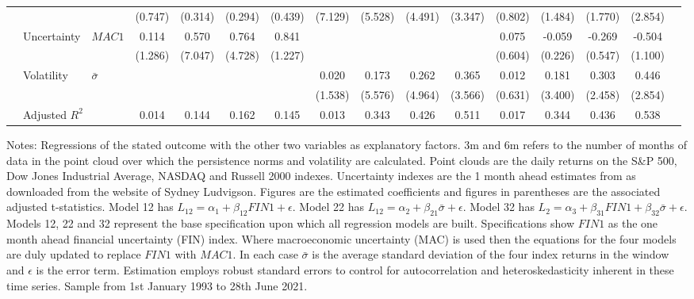 \documentclass{article}
\begin{document}
\begin{sidewaystable}
\begin{center}
\begin{tabular}{ll l c c c c c c c c c c c c c}
			&&&(0.747)&(0.314)&(0.294)&(0.439)&(7.129)&(5.528)&(4.491)&(3.347)&(0.802)&(1.484)&(1.770)&(2.854)\\
			&Uncertainty & $MAC1$&0.114&0.570&0.764&0.841&&&&&0.075&-0.059&-0.269&-0.504\\
			&&&(1.286)&(7.047)&(4.728)&(1.227)&&&&&(0.604)&(0.226)&(0.547)&(1.100)\\
			&Volatility & $\bar{\sigma}$&&&&&0.020&0.173&0.262&0.365&0.012&0.181&0.303&0.446\\
			&&&&&&&(1.538)&(5.576)&(4.964)&(3.566)&(0.631)&(3.400)&(2.458)&(2.854)\\
			&\multicolumn{2}{l}{Adjusted $R^2$}&0.014&0.144&0.162&0.145&0.013&0.343&0.426&0.511&0.017&0.344&0.436&0.538\\
             \hline
        \end{tabular}
    \end{center}
\footnotesize{Notes: Regressions of the stated outcome with the other two variables as explanatory factors. 3m and 6m refers to the number of months of data in the point cloud over which the persistence norms and volatility are calculated. Point clouds are the daily returns on the S\&P 500, Dow Jones Industrial Average, NASDAQ and Russell 2000 indexes. Uncertainty indexes are the 1 month ahead estimates from \cite{jurado2015measuring} as downloaded from the website of Sydney Ludvigson. Figures are the estimated coefficients and figures in parentheses are the associated \cite{newey1987simple} adjusted t-statistics. Model 12 has $L_{12} = \alpha_1 + \beta_{12}FIN1 + \epsilon$. Model 22 has $L_{12} = \alpha_2 + \beta_{21}\bar{\sigma} + \epsilon$. Model 32 has $L_{2} = \alpha_3 + \beta_{31}FIN1 + \beta_{32}\bar{\sigma} + \epsilon$. Models 12, 22 and 32 represent the base specification upon which all regression models are built. Specifications show $FIN1$ as the one month ahead financial uncertainty (FIN) index. Where macroeconomic uncertainty (MAC) is used then the equations for the four models are duly updated to replace $FIN1$ with $MAC1$. In each case $\bar{\sigma}$ is the average standard deviation of the four index returns in the window and $\epsilon$ is the error term. Estimation employs \cite{newey1987simple} robust standard errors to control for autocorrelation and heteroskedasticity inherent in these time series. Sample from 1st January 1993 to 28th June 2021.}
\end{sidewaystable}
\end{document}
